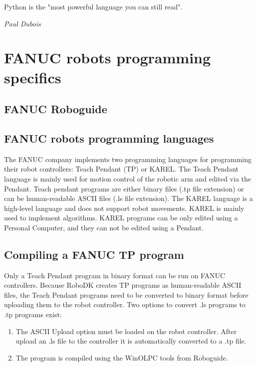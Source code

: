 \label{chap:implementation}

\epigraph{Python is the "most powerful language you can still read".}{\textit{Paul Dubois}}

\section{FANUC robots programming specifics}

\subsection{FANUC Roboguide}



\subsection{FANUC robots programming languages}

The FANUC company implements two programming languages for programming their robot controllers: Teach Pendant (TP) or KAREL. The Teach Pendant language is mainly used for motion control of the robotic arm and edited via the Pendant. Teach pendant programs are either binary files (.tp file extension) or can be human-readable ASCII files (.ls file extension). The KAREL language is a high-level language and does not support robot movements. KAREL is mainly used to implement algorithms. KAREL programs can be only edited using a Personal Computer, and they can not be edited using a Pendant.

\subsection{Compiling a FANUC TP program}

Only a Teach Pendant program in binary format can be run on FANUC controllers. Because RoboDK creates TP programs as human-readable ASCII files, the Teach Pendant programs need to be converted to binary format before uploading them to the robot controller. Two options to convert .ls programs to .tp programs exist:

\begin{enumerate}
\item The ASCII Upload option must be loaded on the robot controller. After upload an .ls file to the controller it is automatically converted to a .tp file.
\item The program is compiled using the WinOLPC tools from Roboguide.
\end{enumerate}


